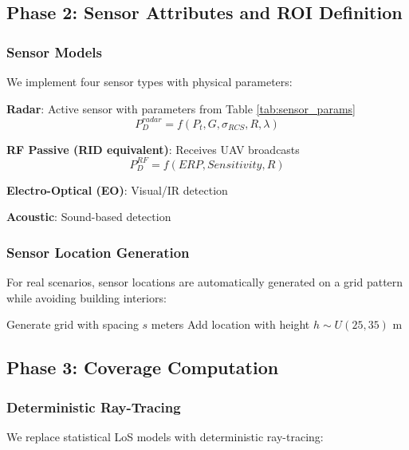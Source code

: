 \subsection{Phase 2: Sensor Attributes and ROI Definition}

\subsubsection{Sensor Models}

We implement four sensor types with physical parameters:

\textbf{Radar}: Active sensor with parameters from Table \ref{tab:sensor_params}
\begin{equation}
P_D^{radar} = f(P_t, G, \sigma_{RCS}, R, \lambda)
\end{equation}

\textbf{RF Passive (RID equivalent)}: Receives UAV broadcasts
\begin{equation}
P_D^{RF} = f(ERP, Sensitivity, R)
\end{equation}

\textbf{Electro-Optical (EO)}: Visual/IR detection

\textbf{Acoustic}: Sound-based detection

\subsubsection{Sensor Location Generation}

For real scenarios, sensor locations are automatically generated on a grid pattern while avoiding building interiors:

\begin{algorithmic}
\STATE Generate grid with spacing $s$ meters
    \STATE Add location with height $h \sim U(25, 35)$ m
  \ENDIF
\ENDFOR
\end{algorithmic}

\subsection{Phase 3: Coverage Computation}

\subsubsection{Deterministic Ray-Tracing}

We replace statistical LoS models with deterministic ray-tracing:

